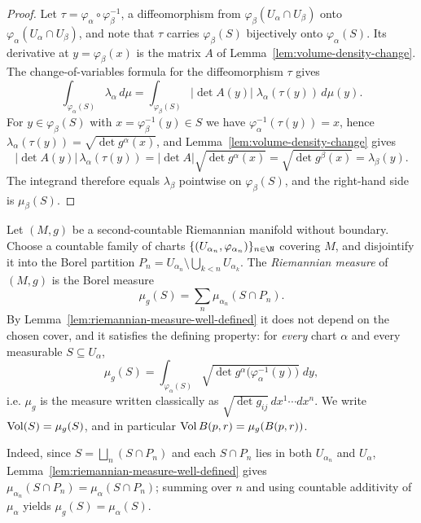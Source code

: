 \begin{proof}
\sketch
{}

Let $\tau=\varphi_\alpha\circ\varphi_\beta^{-1}$, a diffeomorphism from
$\varphi_\beta(U_\alpha\cap U_\beta)$ onto $\varphi_\alpha(U_\alpha\cap U_\beta)$, and note
that $\tau$ carries $\varphi_\beta(S)$ bijectively onto $\varphi_\alpha(S)$. Its derivative
at $y=\varphi_\beta(x)$ is the matrix $A$ of Lemma~\ref{lem:volume-density-change}. The
change-of-variables formula for the diffeomorphism $\tau$ gives
$$\int_{\varphi_\alpha(S)}\lambda_\alpha\,d\mu
=\int_{\varphi_\beta(S)}\lvert\det A(y)\rvert\;\lambda_\alpha(\tau(y))\,d\mu(y).$$
For $y\in\varphi_\beta(S)$ with $x=\varphi_\beta^{-1}(y)\in S$ we have
$\varphi_\alpha^{-1}(\tau(y))=x$, hence
$\lambda_\alpha(\tau(y))=\sqrt{\det g^\alpha(x)}$, and Lemma~\ref{lem:volume-density-change}
gives
$$\lvert\det A(y)\rvert\,\lambda_\alpha(\tau(y))
=\lvert\det A\rvert\sqrt{\det g^\alpha(x)}=\sqrt{\det g^\beta(x)}=\lambda_\beta(y).$$
The integrand therefore equals $\lambda_\beta$ pointwise on $\varphi_\beta(S)$, and the
right-hand side is $\mu_\beta(S)$.
\end{proof}

\begin{definition}
\label{def:riemannian-measure}





Let $(M,g)$ be a second-countable Riemannian manifold without boundary. Choose a countable
family of charts $\{(U_{\alpha_n},\varphi_{\alpha_n})\}_{n\in\N}$ covering $M$, and
disjointify it into the Borel partition
$P_n=U_{\alpha_n}\setminus\bigcup_{k<n}U_{\alpha_k}$. The \emph{Riemannian measure} of
$(M,g)$ is the Borel measure
$$\mu_g(S)=\sum_{n}\mu_{\alpha_n}(S\cap P_n).$$
By Lemma~\ref{lem:riemannian-measure-well-defined} it does not depend on the chosen cover, and
it satisfies the defining property: for \emph{every} chart $\alpha$ and every measurable
$S\subseteq U_\alpha$,
$$\mu_g(S)=\int_{\varphi_\alpha(S)}\sqrt{\det g^\alpha\bigl(\varphi_\alpha^{-1}(y)\bigr)}\;dy,$$
i.e. $\mu_g$ is the measure written classically as $\sqrt{\det g_{ij}}\,dx^1\cdots dx^n$. We
write $\operatorname{Vol}(S)=\mu_g(S)$, and in particular $\operatorname{Vol} B(p,r)=\mu_g(B(p,r))$.

Indeed, since $S=\bigsqcup_n (S\cap P_n)$ and each $S\cap P_n$ lies in both $U_{\alpha_n}$ and
$U_\alpha$, Lemma~\ref{lem:riemannian-measure-well-defined} gives
$\mu_{\alpha_n}(S\cap P_n)=\mu_\alpha(S\cap P_n)$; summing over $n$ and using countable
additivity of $\mu_\alpha$ yields $\mu_g(S)=\mu_\alpha(S)$.
\end{definition}

